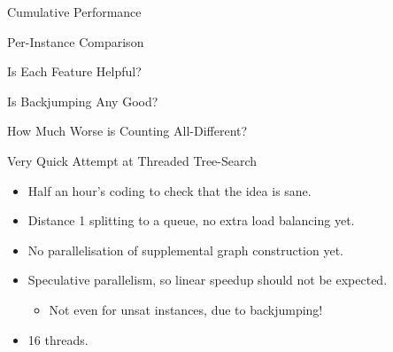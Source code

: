 \documentclass{beamer}
\begin{document}
\begin{frame}{Cumulative Performance}
    
\end{frame}

\begin{frame}{Per-Instance Comparison}
    
\end{frame}

\begin{frame}{Is Each Feature Helpful?}
    
\end{frame}

\begin{frame}{Is Backjumping Any Good?}
    
\end{frame}

\begin{frame}{How Much Worse is Counting All-Different?}
    
\end{frame}

\begin{frame}{Very Quick Attempt at Threaded Tree-Search}
     {
        \begin{itemize}
            \item Half an hour's coding to check that the idea is sane.
            \item Distance 1 splitting to a queue, no extra load balancing yet.
            \item No parallelisation of supplemental graph construction yet.
            \item Speculative parallelism, so linear speedup should not be expected.
                \begin{itemize}
                    \item Not even for unsat instances, due to backjumping!
                \end{itemize}
            \item 16 threads.
        \end{itemize}
    }

     {
        
    }

     {
        
    }
\end{frame}

\section{}
\end{document}
